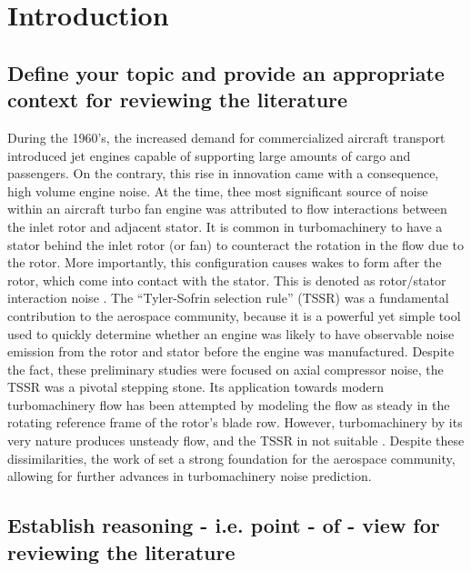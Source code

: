 \section{Introduction}
\subsection{Define your topic and provide an appropriate context for reviewing the literature}
During the 1960's, the increased demand for commercialized aircraft transport 
introduced jet engines capable of supporting large amounts of cargo and passengers. 
On the contrary, this rise in innovation came with a consequence, high volume 
engine noise.  At the time, thee most significant source of noise within an 
aircraft turbo fan engine was attributed to flow interactions between the 
inlet rotor and adjacent stator. 
It is common in turbomachinery to have a stator behind the inlet rotor (or fan) 
to counteract the rotation in the flow due to the rotor. More importantly, 
this configuration causes wakes to form after the rotor, which come into contact 
with the stator. This is denoted as rotor/stator interaction noise \cite{Tyler1962}. 
The ``Tyler-Sofrin selection rule'' (TSSR) was a fundamental contribution 
to the aerospace community, because it is a powerful yet simple 
tool used to quickly determine whether an engine was likely to have 
observable noise emission from the rotor and stator before the engine was manufactured. 
Despite the fact, these preliminary studies were focused on axial compressor noise, the 
TSSR was a pivotal stepping stone. Its application towards modern 
turbomachinery flow has been attempted by modeling the flow as steady in the 
rotating reference frame of the rotor's blade row. However, turbomachinery by 
its very nature produces unsteady flow, and the TSSR in 
not suitable \cite{Holmes2011}. Despite these dissimilarities, the work of 
\cite{Tyler1962} set a strong foundation for the aerospace community, 
allowing for further advances in turbomachinery noise prediction.

\subsection{Establish reasoning - i.e. point - of - view for reviewing the literature}
